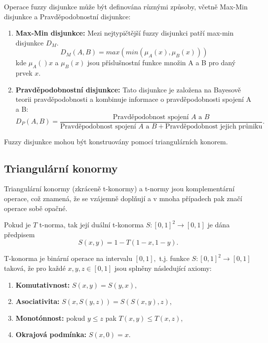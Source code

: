 Operace fuzzy disjunkce může být definována různými způsoby, včetně Max-Min disjunkce a Pravd\v epodobnostn\' i disjunkce:
\begin{enumerate}
    \item \textbf{Max-Min disjunkce:}
    Mezi nejtypičtější fuzzy disjunkci patří max-min disjunkce $D_M$.
    $$D_M(A,B) = max(min(\mu_A(x), \mu_B(x)))$$
    kde $\mu_A()x$ a $\mu_B(x)$ jsou příslušnostní funkce množin A a B pro daný prvek $x.$
    \item \textbf{Pravd\v epodobnostn\' i disjunkce:}
    Tato disjunkce je založena na Bayesově teorii pravděpodobnosti a kombinuje informace o pravděpodobnosti spojení A a B:
    $$D_P(A,B) = \frac{\text{Pravděpodobnost spojení } A \text{ a } B}{\text{Pravděpodobnost spojení } A \text{ a } B + \text{Pravděpodobnost jejich průniku}}.$$
\end{enumerate}

Fuzzy disjunkce mohou být konstruovány pomocí triangulárních konorem.

\subsection{Triangul\'arn\'i konormy} 
\label{sec: Triangulární konormy}
Triangulární konormy (zkráceně t-konormy) a t-normy jsou komplementární operace, což znamená, že se vzájemně dopl\v nují a v mnoha případech pak značí operace sobě opačné.
\begin{definition}
    \cite{hlinena}
    Pokud je $T$ t-norma, tak její duální t-konorma $S: [0,1]^2 \rightarrow [0,1]$ je dána předpisem $$S(x,y) = 1 - T(1-x, 1-y).$$
\end{definition}
\begin{definition}
    T-konorma je binární operace na intervalu $[0,1],$ t.j. funkce $S: [0,1]^2 \rightarrow [0,1]$ taková, že pro každé $x, y, z \in [0,1]$ jsou splněny následující axiomy:
    \begin{enumerate}
        \item \textbf{Komutativnost: } $S(x,y) = S(y,x),$
        \item \textbf{Asociativita: } $S(x,S(y,z)) = S(S(x,y),z)$,
        \item \textbf{Monotónnost:} pokud $y \leq z$ pak $T(x, y) \leq T(x, z)$,
        \item \textbf{Okrajová podmínka: } $S(x,0) = x.$
    \end{enumerate}
\end{definition}

